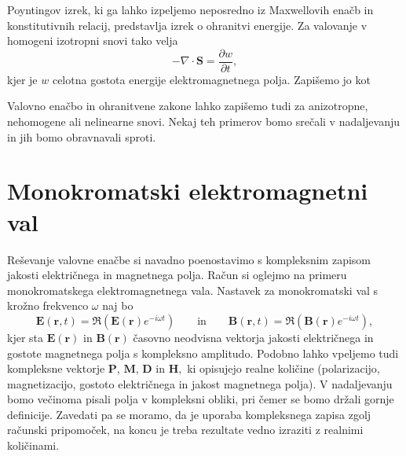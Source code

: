Poyntingov izrek, ki ga lahko izpeljemo neposredno 
iz Maxwellovih enačb in konstitutivnih relacij, predstavlja izrek o ohranitvi 
energije. Za valovanje v homogeni izotropni snovi tako velja
\begin{equation}
-\nabla\cdot\mathbf{S}=\frac{\partial w}{\partial t},
\end{equation}
kjer je $w$ celotna
gostota energije elektromagnetnega polja. Zapišemo jo kot 

Valovno enačbo in ohranitvene zakone lahko zapišemo tudi za anizotropne,
nehomogene ali nelinearne snovi. Nekaj teh primerov bomo srečali v nadaljevanju
in jih bomo obravnavali sproti.

\section{Monokromatski elektromagnetni val}
Reševanje valovne enačbe si navadno poenostavimo s kompleksnim
zapisom jakosti električnega in magnetnega polja. Račun si
oglejmo na primeru monokromatskega elektromagnetnega vala. Nastavek
za monokromatski val s krožno frekvenco $\omega$ naj bo
\begin{equation}
\mathbf{E}(\mathbf{r},t)  =\mathfrak{\Re}(\mathbf{E}(\mathbf{r})e^{-i\omega t})\qquad \textrm{in} \qquad
\mathbf{B}(\mathbf{r},t)  =\mathfrak{\Re}(\mathbf{B}(\mathbf{r})e^{-i\omega t}),
\label{eq:rval}
\end{equation}
kjer sta $\mathbf E(\mathbf{r})$ in $\mathbf B(\mathbf{r})$ časovno
neodvisna vektorja jakosti električnega in gostote
magnetnega polja s kompleksno
amplitudo. Podobno lahko vpeljemo tudi kompleksne vektorje $\mathbf{P}$,
$\mathbf{M}$, $\mathbf{D}$ in $\mathbf{H},$ ki opisujejo realne količine (polarizacijo,
magnetizacijo, gostoto električnega in jakost magnetnega polja).
V nadaljevanju bomo večinoma pisali polja v kompleksni obliki, pri
čemer se bomo držali gornje definicije. Zavedati pa se moramo, da
je uporaba kompleksnega zapisa zgolj računski pripomoček, na koncu
je treba rezultate vedno izraziti z realnimi količinami. 

